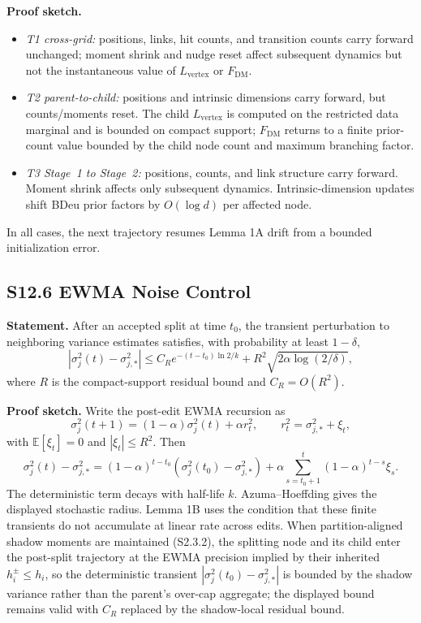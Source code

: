 \documentclass[11pt]{article}
\begin{document}
\textbf{Proof sketch.}
\begin{itemize}[leftmargin=1.5em]
  \item \emph{T1 cross-grid:} positions, links, hit counts, and transition counts carry forward unchanged; moment shrink and nudge reset affect subsequent dynamics but not the instantaneous value of $L_{\mathrm{vertex}}$ or $F_{\mathrm{DM}}$.
  \item \emph{T2 parent-to-child:} positions and intrinsic dimensions carry forward, but counts/moments reset. The child $L_{\mathrm{vertex}}$ is computed on the restricted data marginal and is bounded on compact support; $F_{\mathrm{DM}}$ returns to a finite prior-count value bounded by the child node count and maximum branching factor.
  \item \emph{T3 Stage~1 to Stage~2:} positions, counts, and link structure carry forward. Moment shrink affects only subsequent dynamics. Intrinsic-dimension updates shift BDeu prior factors by $O(\log d)$ per affected node.
\end{itemize}
In all cases, the next trajectory resumes Lemma 1A drift from a bounded initialization error.

\subsection*{S12.6 EWMA Noise Control}
\textbf{Statement.} After an accepted split at time $t_0$, the transient perturbation to neighboring variance estimates satisfies, with probability at least $1-\delta$,
\[
|\sigma_j^2(t)-\sigma_{j,*}^2|
\le
C_R e^{-(t-t_0)\ln2/k}
+R^2\sqrt{2\alpha\log(2/\delta)},
\]
where $R$ is the compact-support residual bound and $C_R=O(R^2)$.

\textbf{Proof sketch.} Write the post-edit EWMA recursion as
\[
\sigma_j^2(t+1)
=(1-\alpha)\sigma_j^2(t)+\alpha r_t^2,
\qquad
r_t^2=\sigma_{j,*}^2+\xi_t,
\]
with $\mathbb E[\xi_t]=0$ and $|\xi_t|\le R^2$. Then
\[
\sigma_j^2(t)-\sigma_{j,*}^2
=(1-\alpha)^{t-t_0}
(\sigma_j^2(t_0)-\sigma_{j,*}^2)
+\alpha\sum_{s=t_0+1}^t(1-\alpha)^{t-s}\xi_s.
\]
The deterministic term decays with half-life $k$. Azuma--Hoeffding gives the displayed stochastic radius. Lemma 1B uses the condition that these finite transients do not accumulate at linear rate across edits. When partition-aligned shadow moments are maintained (S2.3.2), the splitting node and its child enter the post-split trajectory at the EWMA precision implied by their inherited $h_i^\pm\le h_i$, so the deterministic transient $|\sigma_j^2(t_0)-\sigma_{j,*}^2|$ is bounded by the shadow variance rather than the parent's over-cap aggregate; the displayed bound remains valid with $C_R$ replaced by the shadow-local residual bound.
\end{document}
